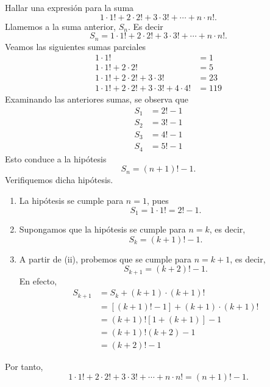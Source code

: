\begin{example}
    Hallar una expresión para la suma
    $$1 \cdot 1! + 2 \cdot 2! + 3 \cdot 3! + \cdots + n \cdot n!.$$
    \demostracion Llamemos a la suma anterior, $S_n$. Es decir
    $$S_n=1 \cdot 1! + 2 \cdot 2! + 3 \cdot 3! + \cdots + n \cdot n!.$$
    Veamos las siguientes sumas parciales
    \begin{align*}
        1 \cdot 1! &=1 \\
        1 \cdot 1!+2 \cdot 2! &=5 \\
        1 \cdot 1!+2 \cdot 2! + 3 \cdot 3! &=23 \\
        1 \cdot 1!+2 \cdot 2! + 3 \cdot 3! +4 \cdot 4! &=119
    \end{align*}
    Examinando las anteriores sumas, se observa que
    \begin{align*}
        S_1 &=2!-1 \\
        S_2 &=3!-1 \\
        S_3 &=4!-1 \\
        S_4 &=5!-1
    \end{align*}
    Esto conduce a la hipótesis
    $$S_n=(n+1)!-1.$$
    Verifiquemos dicha hipótesis.
    \begin{enumerate}[label=\roman*.]
        \item La hipótesis se cumple para $n=1$, pues
        $$S_1=1 \cdot 1!=2!-1.$$
        \item Supongamos que la hipótesis se cumple para $n=k$, es decir,
        $$S_k=(k+1)!-1.$$
        \item A partir de (ii), probemos que se cumple para $n=k+1$, es decir,
        $$S_{k+1}=(k+2)!-1.$$
        En efecto,
        \begin{align*}
            S_{k+1} &= S_k + (k+1) \cdot (k+1)! \\
            &=[(k+1)!-1]+(k+1) \cdot (k+1)! \\
            &=(k+1)![1+(k+1)]-1 \\
            &=(k+1)!(k+2)-1 \\
            &=(k+2)!-1
        \end{align*}
    \end{enumerate}
    Por tanto,
    $$1 \cdot 1! + 2 \cdot 2! + 3 \cdot 3! + \cdots + n \cdot n! = (n+1)!-1.$$
\end{example}

\newpage

